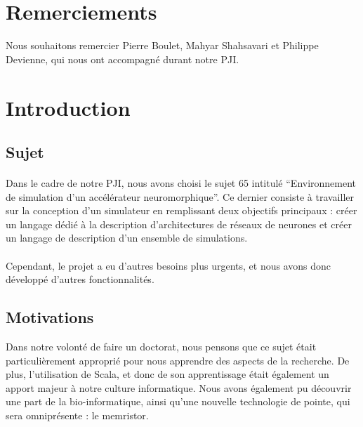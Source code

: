 \documentclass[a4paper,10pt]{article}
\begin{document}
\section*{Remerciements}

Nous souhaitons remercier Pierre Boulet, Mahyar Shahsavari et Philippe Devienne, qui nous ont accompagné durant notre PJI.

\newpage


\tableofcontents

\newpage


\section*{Introduction}

\subsection*{Sujet} 

\paragraph{}
Dans le cadre de notre PJI, nous avons choisi le sujet 65 intitulé \enquote{Environnement de simulation d'un accélérateur neuromorphique}. Ce dernier consiste à travailler sur la conception d'un simulateur en remplissant deux objectifs principaux : créer un langage dédié à la description d'architectures de réseaux de neurones et créer un langage de description d'un ensemble de simulations.

\paragraph{}
Cependant, le projet a eu d’autres besoins plus urgents, et nous avons donc développé d'autres fonctionnalités.

\subsection*{Motivations}
Dans notre volonté de faire un doctorat, nous pensons que ce sujet était particulièrement approprié pour nous apprendre des aspects de la recherche. De plus, l’utilisation de Scala, et donc de son apprentissage était également un apport majeur à notre culture informatique. Nous avons également pu découvrir une part de la bio-informatique, ainsi qu'une nouvelle technologie de pointe, qui sera omniprésente : le memristor.
\end{document}
